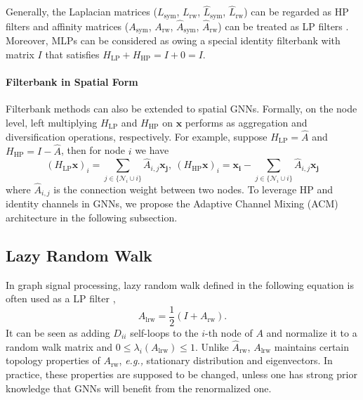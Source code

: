 \documentclass{article}
\newcommand\eg{\textit{e.g.,}}
\newcommand{\0}{{\boldsymbol{0}}}
\newcommand{\6}{{\partial}}
\newcommand{\8}{{\infty}}
\newcommand{\4}{{\nabla}}
\begin{document}
Generally, the Laplacian matrices ($L_\text{sym}$, $L_\text{rw}$, $\hat{L}_\text{sym}$, $\hat{L}_\text{rw}$) can be regarded as HP filters \cite{ekambaram2014graph} and affinity matrices ($A_\text{sym}$, $A_\text{rw}$, $\hat{A}_\text{sym}$, $\hat{A}_\text{rw}$) can be treated as LP filters \cite{maehara2019revisiting, hamilton2020graph}. Moreover, MLPs can be considered as owing a special identity filterbank with matrix $I$ that satisfies $H_\text{LP} + H_\text{HP} = I+0 = I$.
\paragraph{Filterbank in Spatial Form}
Filterbank methods can also be extended to spatial GNNs. Formally, on the node level, left multiplying $H_\text{LP}$ and $H_\text{HP}$ on $\bm{x}$ performs as aggregation and diversification operations, respectively. For example, suppose $H_\text{LP} = \hat{A}$ and $H_\text{HP}=I-\hat{A}$, then for node $i$ we have
\begin{equation}
\label{eq:spatial_form_filterbank}
    (H_\text{LP} \bm{x})_i =  \sum_{j \in \{\mathcal{N}_i \cup i\} } \hat{A}_{i,j} \bm{x_j}, \ (H_\text{HP} \bm{x})_i = \bm{x_i} - \sum_{j \in \{\mathcal{N}_i \cup i\} } \hat{A}_{i,j} \bm{x_j}
\end{equation} 
where $\hat{A}_{i,j}$ is the connection weight between two nodes. To leverage HP and identity channels in GNNs, we propose the Adaptive Channel Mixing (ACM) architecture in the following subsection.
\iffalse
\subsection{Lazy Random Walk}
\label{sec:lazy_random_walk}
In graph signal processing, lazy random walk defined in the following equation is often used as a LP filter \cite{ekambaram2014graph},
\begin{equation}
    A_{\text{lrw}} = \frac{1}{2}(I+A_{\text{rw}}).
\end{equation}
It can be seen as adding $D_{ii}$ self-loops to the $i$-th node of $A$ and normalize it to a random walk matrix and $0 \leq \lambda_i(A_{\text{lrw}}) \leq 1$. Unlike $\hat{A}_\text{rw}$, $A_{\text{lrw}}$ maintains certain topology properties of $A_\text{rw}$, \eg{} stationary distribution and eigenvectors. In practice, these properties are supposed to be changed, unless one has strong prior knowledge that GNNs will benefit from the renormalized one. 
\end{document}

